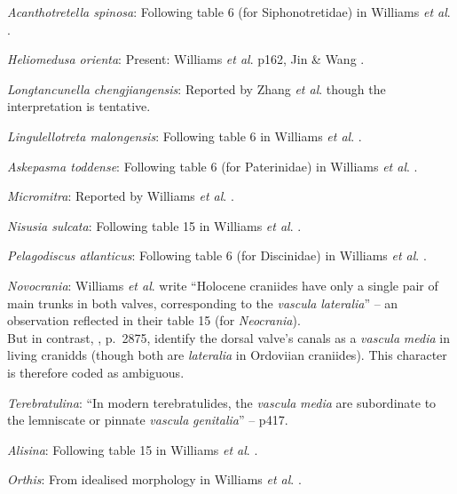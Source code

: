 \documentclass[]{book}
\theoremstyle{definition}
\theoremstyle{definition}
\theoremstyle{definition}
\theoremstyle{remark}
\begin{document}
\emph{Acanthotretella spinosa}: Following table 6 (for Siphonotretidae)
in Williams \emph{et al}.
\citeyearpar{Williams2000BrachiopodaLinguliformea}.

\emph{Heliomedusa orienta}: Present: Williams \emph{et al}.
\citeyearpar{Williams2000BrachiopodaLinguliformea} p162, Jin \& Wang
\citeyearpar{Jin1992Revisionof}.

\emph{Longtancunella chengjiangensis}: Reported by Zhang \emph{et al}.
\citeyearpar{Zhang2007Agregarious} though the interpretation is
tentative.

\emph{Lingulellotreta malongensis}: Following table 6 in Williams
\emph{et al}. \citeyearpar{Williams2000BrachiopodaLinguliformea}.

\emph{Askepasma toddense}: Following table 6 (for Paterinidae) in
Williams \emph{et al}.
\citeyearpar{Williams2000BrachiopodaLinguliformea}.

\emph{Micromitra}: Reported by Williams \emph{et al}.
\citeyearpar{Williams1998Thediversity}.

\emph{Nisusia sulcata}: Following table 15 in Williams \emph{et al}.
\citeyearpar{Williams2000BrachiopodaLinguliformea}.

\emph{Pelagodiscus atlanticus}: Following table 6 (for Discinidae) in
Williams \emph{et al}.
\citeyearpar{Williams2000BrachiopodaLinguliformea}.

\emph{Novocrania}: Williams \emph{et al}.
\citeyearpar{Williams2000BrachiopodaLinguliformea} write ``Holocene
craniides have only a single pair of main trunks in both valves,
corresponding to the \emph{vascula} \emph{lateralia}'' -- an observation
reflected in their table 15 (for \emph{Neocrania}).\\
But in contrast, \citet{Williams2007PartH}, p.~2875, identify the dorsal
valve's canals as a \emph{vascula} \emph{media} in living cranidds
(though both are \emph{lateralia} in Ordoviian craniides). This
character is therefore coded as ambiguous.

\emph{Terebratulina}: ``In modern terebratulides, the \emph{vascula}
\emph{media} are subordinate to the lemniscate or pinnate \emph{vascula}
\emph{genitalia}'' -- \citet{Williams1997BrachiopodaRevised} p417.

\emph{Alisina}: Following table 15 in Williams \emph{et al}.
\citeyearpar{Williams2000BrachiopodaLinguliformea}.

\emph{Orthis}: From idealised morphology in Williams \emph{et al}.
\citeyearpar{Williams2000BrachiopodaLinguliformea}.
\end{document}
